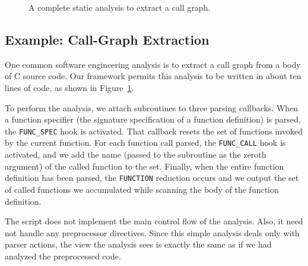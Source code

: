 \documentclass{article}
\newcommand{\C}{\mbox{C}}
\begin{document}
\begin{figure}[t]
\begin{center}
\begin{small}
\end{small}
\caption{A complete static analysis to extract a call graph.}
\label{fig:call_graph_extractor}
\end{center}
\end{figure}

\subsection{Example: Call-Graph Extraction}
\label{sec:call_graph_extraction}


One common software engineering analysis is to extract a call graph from a
body of \C{} source code.  Our framework permits this analysis to be
written in about ten lines of code, as shown in
Figure~\ref{fig:call_graph_extractor}.

To perform the analysis, we attach subroutines to three parsing
callbacks.  When a function specifier (the signature specification of a
function definition) is parsed, the \texttt{FUNC\_SPEC} hook is
activated.  That callback resets the set of functions invoked by
the current function.  For each function call parsed, the
\texttt{FUNC\_CALL} hook is activated, and we add the name (passed to
the subroutine as the zeroth argument) of the called function to the
set.  Finally, when the entire function definition has been parsed, the
\texttt{FUNCTION} reduction occurs and we output the set of called
functions we accumulated while scanning the body of the function
definition.

The script does not implement the main control flow of the
analysis.  Also, it need not handle any preprocessor directives.  Since
this simple analysis deals only with parser actions, the view the
analysis sees is exactly the same as if we had analyzed the preprocessed 
code.
\end{document}
